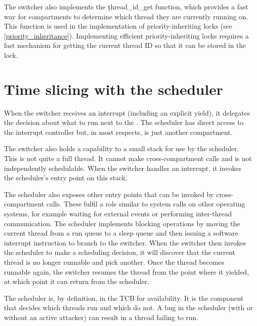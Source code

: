 
The switcher also implements the \c{thread_id_get} function, which provides a fast way for compartments to determine which thread they are currently running on.
This function is used in the implementation of priority-inheriting locks (see \ref{priority_inheritance}).
Implementing efficient priority-inheriting locks requires a fast mechanism for getting the current thread ID so that it can be stored in the lock.


\section{Time slicing with the scheduler}

When the switcher receives an interrupt (including an explicit yield), it delegates the decision about what to run next to the .
The scheduler has direct access to the interrupt controller but, in most respects, is just another compartment.

The switcher also holds a capability to a small stack for use by the scheduler.
This is not quite a full thread.
It cannot make cross-compartment calls and is not independently schedulable.
When the switcher handles an interrupt, it invokes the scheduler's entry point on this stack.

The scheduler also exposes other entry points that can be invoked by cross-compartment calls.
These fulfil a role similar to system calls on other operating systems, for example waiting for external events or performing inter-thread communication.
The scheduler implements blocking operations by moving the current thread from a run queue to a sleep queue and then issuing a software interrupt instruction to branch to the switcher.
When the switcher then invokes the scheduler to make a scheduling decision, it will discover that the current thread is no longer runnable and pick another.
Once the thread becomes runnable again, the switcher resumes the thread from the point where it yielded, at which point it can return from the scheduler.

The scheduler is, by definition, in the TCB for availability.
It is the component that decides which threads run and which do not.
A bug in the scheduler (with or without an active attacker) can result in a thread failing to run.

